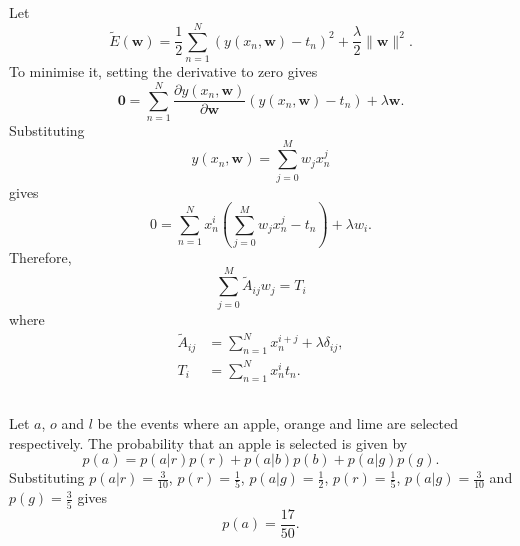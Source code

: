 \subsection{}
Let
%
\begin{equation}
\tilde{E}(\mathbf{w}) = \frac{1}{2} \sum_{n = 1}^{N} \left( y(x_n, \mathbf{w}) - t_n \right) ^ 2 + \frac{\lambda}{2} \lVert \mathbf{w} \rVert ^ 2.
\end{equation}
%
To minimise it, setting the derivative to zero gives
%
\begin{equation}
\mathbf{0} = \sum_{n = 1}^{N} \frac{\partial y(x_n, \mathbf{w})}{\partial \mathbf{w}} \left( y(x_n, \mathbf{w}) - t_n \right) + \lambda \mathbf{w}.
\end{equation}
%
Substituting 
%
\begin{equation}
y(x_n, \mathbf{w}) = \sum_{j = 0}^{M} w_j x_n^j
\end{equation}
%
gives
%
\begin{equation}
0 = \sum_{n = 1}^{N} x_n^i \left( \sum_{j = 0}^{M} w_j x_n^j - t_n \right) + \lambda w_i.
\end{equation}
%
Therefore,
%
\begin{equation}
\sum_{j = 0}^{M} \tilde{A}_{ij} w_j = T_i
\end{equation}
%
where
%
\begin{equation}
\begin{aligned}
\tilde{A}_{ij} &= \sum_{n = 1}^{N} x_n^{i + j} + \lambda \delta_{ij}, \\
T_i &= \sum_{n = 1}^{N} x_n^i t_n.
\end{aligned}
\end{equation}


\subsection{}
Let $a$, $o$ and $l$ be the events where an apple, orange and lime are selected respectively.
The probability that an apple is selected is given by
%
\begin{equation}
p(a) = p(a | r) p(r) + p(a | b) p(b) + p(a | g) p(g).
\end{equation}
%
Substituting $p(a | r) = \frac{3}{10}$, $p(r) = \frac{1}{5}$, $p(a | g) = \frac{1}{2}$, $p(r) = \frac{1}{5}$, $p(a | g) = \frac{3}{10}$ and $p(g) = \frac{3}{5}$ gives
%
\begin{equation}
p(a) = \frac{17}{50}.
\end{equation}
%

